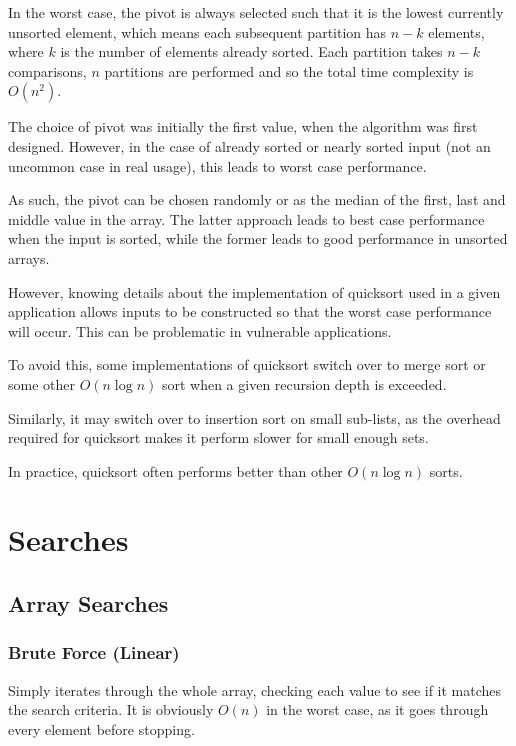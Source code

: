 \documentclass[]{article}
\begin{document}
In the worst case, the pivot is always selected such that it is the lowest currently unsorted element, which means each subsequent partition has $n-k$ elements, where $k$ is the number of elements already sorted. Each partition takes $n-k$ comparisons, $n$ partitions are performed and so the total time complexity is $O(n^2)$.

The choice of pivot was initially the first value, when the algorithm was first designed. However, in the case of already sorted or nearly sorted input (not an uncommon case in real usage), this leads to worst case performance.

As such, the pivot can be chosen randomly or as the median of the first, last and middle value in the array. The latter approach leads to best case performance when the input is sorted, while the former leads to good performance in unsorted arrays.

However, knowing details about the implementation of quicksort used in a given application allows inputs to be constructed so that the worst case performance will occur. This can be problematic in vulnerable applications.

To avoid this, some implementations of quicksort switch over to merge sort or some other $O(n\log{n})$ sort when a given recursion depth is exceeded.

Similarly, it may switch over to insertion sort on small sub-lists, as the overhead required for quicksort makes it perform slower for small enough sets.

In practice, quicksort often performs better than other $O(n\log{n})$ sorts.

\pagebreak

\section{Searches}

\subsection{Array Searches}

\subsubsection{Brute Force (Linear)}

Simply iterates through the whole array, checking each value to see if it matches the search criteria. It is obviously $O(n)$ in the worst case, as it goes through every element before stopping.
\end{document}
